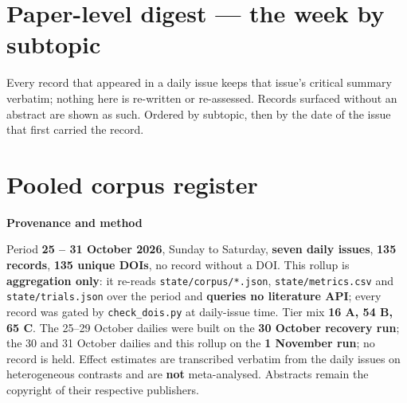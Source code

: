\documentclass[10pt]{article}
\begin{document}
\section*{\sffamily\bfseries\color{Deep}Paper-level digest --- the week by subtopic}
\vspace{-1.5mm}{\color{Teal}\rule{\linewidth}{1.1pt}}\vspace{1mm}

{\fontsize{7.4}{9}\selectfont\color{Slate}Every record that appeared in a daily issue
keeps that issue's critical summary verbatim; nothing here is re-written or re-assessed.
Records surfaced without an abstract are shown as such. Ordered by subtopic, then by the
date of the issue that first carried the record.\par}



\section*{\sffamily\bfseries\color{Deep}Pooled corpus register}
\vspace{-1.5mm}{\color{Teal}\rule{\linewidth}{1.1pt}}\vspace{2.5mm}



\vspace{4mm}
\begin{keybox}
{\sffamily\bfseries\footnotesize\color{Deep}Provenance and method}\\[1.2mm]
{\fontsize{7.2}{8.8}\selectfont
Period \textbf{25 -- 31 October 2026}, Sunday to Saturday, \textbf{seven daily issues},
\textbf{135 records}, \textbf{135 unique DOIs}, no record without a DOI. This rollup is
\textbf{aggregation only}: it re-reads \texttt{state/corpus/*.json}, \texttt{state/metrics.csv} and
\texttt{state/trials.json} over the period and \textbf{queries no literature API}; every record was gated by
\texttt{check\_dois.py} at daily-issue time. Tier mix \textbf{16 A, 54 B, 65 C}. The 25--29 October dailies were
built on the \textbf{30 October recovery run}; the 30 and 31 October dailies and this rollup on the \textbf{1 November
run}; no record is held. Effect estimates are transcribed verbatim from the daily issues on heterogeneous contrasts
and are \textbf{not} meta-analysed. Abstracts remain the copyright of their respective publishers.\par}
\end{keybox}
\end{document}
